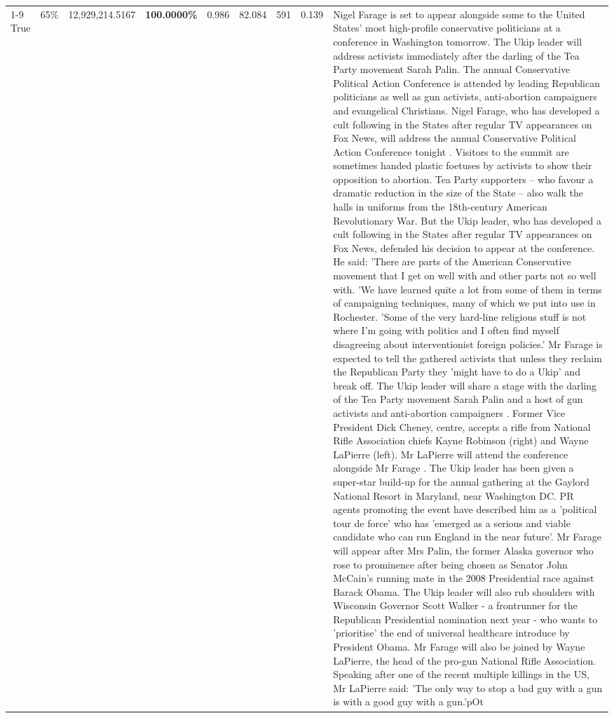 \begin{table}[H]
\begin{tabular}{lllrlllll}
\cline{1-9} \cline{2-9}
True & 65\% & 12,929,214.5167 & \bfseries \color{red} 100.0000\% & 0.986 & 82.084 & 591 & 0.139 & Nigel Farage is set to appear alongside some to the United States' most high-profile conservative politicians at a conference in Washington tomorrow. The Ukip leader will address activists immediately after the darling of the Tea Party movement Sarah Palin. The annual Conservative Political Action Conference is attended by leading Republican politicians as well as gun activists, anti-abortion campaigners and evangelical Christians. Nigel Farage, who has developed a cult following in the States after regular TV appearances on Fox News, will address the annual Conservative Political Action Conference tonight . Visitors to the summit are sometimes handed plastic foetuses by activists to show their opposition to abortion. Tea Party supporters – who favour a dramatic reduction in the size of the State – also walk the halls in uniforms from the 18th-century American Revolutionary War. But the Ukip leader, who has developed a cult following in the States after regular TV appearances on Fox News, defended his decision to appear at the conference. He said: 'There are parts of the American Conservative movement that I get on well with and other parts not so well with. 'We have learned quite a lot from some of them in terms of campaigning techniques, many of which we put into use in Rochester. 'Some of the very hard-line religious stuff is not where I'm going with politics and I often find myself disagreeing about interventionist foreign policies.' Mr Farage is expected to tell the gathered activists that unless they reclaim the Republican Party they 'might have to do a Ukip' and break off. The Ukip leader will share a stage with the darling of the Tea Party movement Sarah Palin and a host of gun activists and anti-abortion campaigners . Former Vice President Dick Cheney, centre, accepts a rifle from National Rifle Association chiefs Kayne Robinson (right) and Wayne LaPierre (left). Mr LaPierre will attend the conference alongside Mr Farage . The Ukip leader has been given a super-star build-up for the annual gathering at the Gaylord National Resort in Maryland, near Washington DC. PR agents promoting the event have described him as a 'political tour de force' who has 'emerged as a serious and viable candidate who can run England in the near future'. Mr Farage will appear after Mrs Palin, the former Alaska governor who rose to prominence after being chosen as Senator John McCain's running mate in the 2008 Presidential race against Barack Obama. The Ukip leader will also rub shoulders with Wisconsin Governor Scott Walker - a frontrunner for the Republican Presidential nomination next year - who wants to 'prioritise' the end of universal healthcare introduce by President Obama. Mr Farage will also be joined by Wayne LaPierre, the head of the pro-gun National Rifle Association. Speaking after one of the recent multiple killings in the US, Mr LaPierre said: 'The only way to stop a bad guy with a gun is with a good guy with a gun.'pOt \\

\end{tabular}
\end{table}
